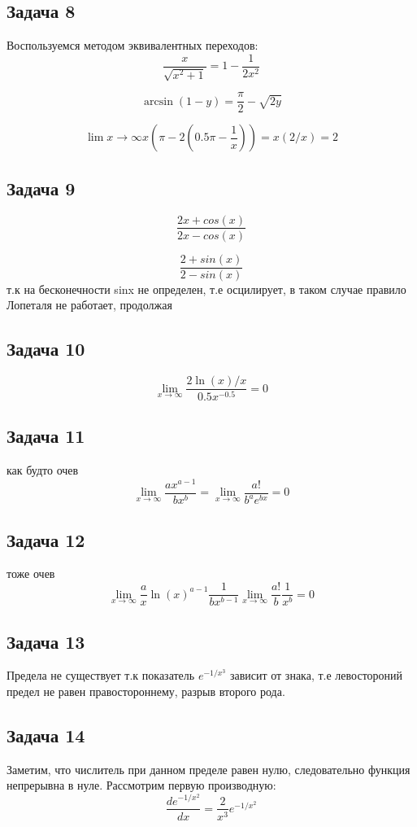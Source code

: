 \documentclass[a4paper,12pt]{article}
\begin{document}
\subsection{Задача 8}
Воспользуемся методом эквивалентных переходов:
\[
\frac{x}{\sqrt{x^2+1}} = 1 - \frac{1}{2x^2}
\]

\[
\arcsin(1-y) = \frac{\pi}{2} - \sqrt{2y}
\]

\[
\lim{x \to \infty} x(\pi - 2(0.5\pi - \frac{1}{x})) = x(2/x)=2
\]

\subsection{Задача 9}
\[
\frac{2x + cos(x)}{2x-cos(x)}
\]

\[
\frac{2 + sin(x)}{2-sin(x)}
\]
т.к на бесконечности sinx не определен, т.е осцилирует, в таком случае правило Лопеталя не работает, продолжая

\subsection{Задача 10}
\[
\lim_{x \to \infty} \frac{2\ln(x)/x}{0.5x^{-0.5}} = 0 
\]

\subsection{Задача 11}
как будто очев 
\[
    \lim_{x \to \infty}\frac{ax^{a-1}}{bx^b} = \lim_{x \to \infty}\frac{a!}{b^ae^{bx}} = 0
\]

\subsection{Задача 12}
тоже очев
\[
\lim_{x \to \infty}\frac{a}{x}\ln(x)^{a-1}\frac{1}{bx^{b-1}} \lim_{x \to \infty} \frac{a!}{b} \frac{1}{x^b} = 0
\]

\subsection{Задача 13}

Предела не существует т.к показатель $e^{-1/x^3}$ зависит от знака, т.е левостороний предел не равен правостороннему, разрыв второго рода.

\subsection{Задача 14}
Заметим, что числитель при данном пределе равен нулю, следовательно функция непрерывна в нуле. Рассмотрим первую производную: 
\[
\frac{de^{-1/x^2}}{dx} = \frac{2}{x^3}e^{-1/x^2}
\]
\end{document}
